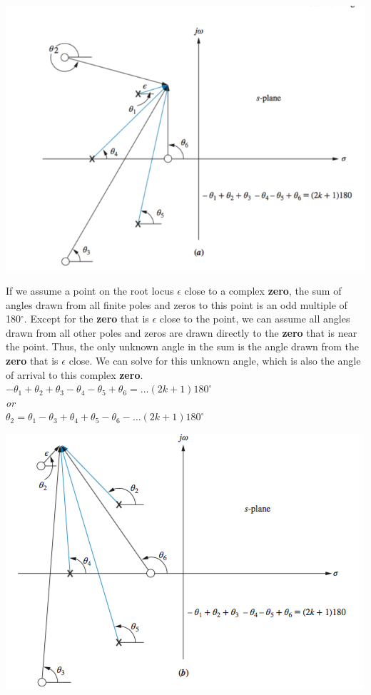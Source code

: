 \documentclass[11pt]{article}
\begin{document}
    \begin{center}
        \includegraphics[width=300 px]{img/angles-pole} \\
    \end{center}    
    
    If we assume a point on the root locus $\epsilon$ close to a complex \textbf{zero}, the sum of angles drawn from all finite poles and zeros to this point is an odd multiple of 180$^\circ$. Except for the \textbf{zero} that is $\epsilon$ close to the point, we can assume all angles drawn from all other poles and zeros are drawn directly to the \textbf{zero} that is near the point. Thus, the only unknown angle in the sum is the angle drawn from the \textbf{zero} that is $\epsilon$ close. We can solve for this unknown angle, which is also the angle of arrival to this complex \textbf{zero}. \\ 

    $-\theta_1 + \theta_2 + \theta_3 - \theta_4 - \theta_5 + \theta_6 =(2k+1)180^\circ$ \\ 
    
    \textit{or} \\ 

    $\theta_2 = \theta_1 - \theta_3 + \theta_4 + \theta_5 - \theta_6 -(2k+1)180^\circ$ \\

    \begin{center}
        \includegraphics[width=300 px]{img/angles-zero} \\
    \end{center}  
\end{document}
